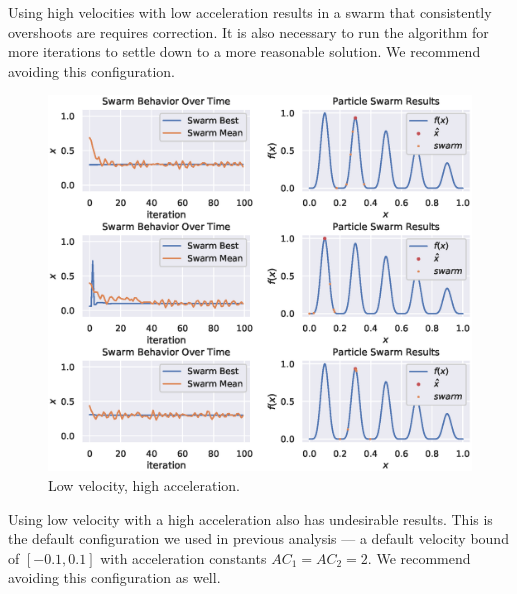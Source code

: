 \documentclass[12pt]{article}
\begin{document}
Using high velocities with low acceleration results in a swarm that consistently overshoots are requires correction.
It is also necessary to run the algorithm for more iterations to settle down to a more reasonable solution.
We recommend avoiding this configuration.

\begin{figure}[H]
    \centering
    \includegraphics[width=\textwidth]{figures/pso/pso-low-vel-high-accel.eps}
    \caption{Low velocity, high acceleration.}\label{fig:pso:low-vel-high-accel}
\end{figure}

Using low velocity with a high acceleration also has undesirable results.
This is the default configuration we used in previous analysis --- a default velocity bound of $[-0.1, 0.1]$ with acceleration constants $AC_1 = AC_2 = 2$.
We recommend avoiding this configuration as well.
\end{document}
